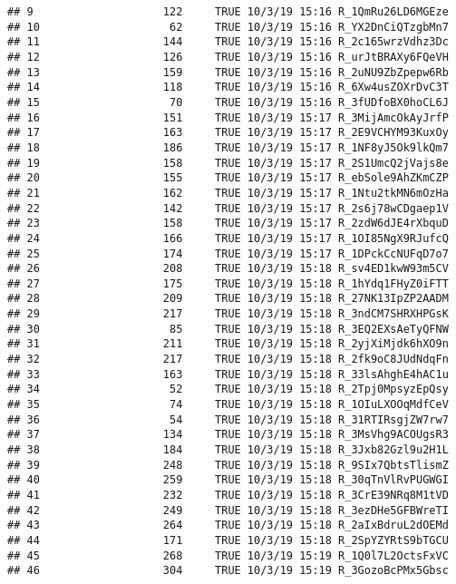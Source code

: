 \documentclass[]{article}
\begin{document}
\begin{verbatim}
## 9                    122     TRUE 10/3/19 15:16 R_1QmRu26LD6MGEze
## 10                    62     TRUE 10/3/19 15:16 R_YX2DnCiQTzgbMn7
## 11                   144     TRUE 10/3/19 15:16 R_2c165wrzVdhz3Dc
## 12                   126     TRUE 10/3/19 15:16 R_urJtBRAXy6FQeVH
## 13                   159     TRUE 10/3/19 15:16 R_2uNU9ZbZpepw6Rb
## 14                   118     TRUE 10/3/19 15:16 R_6Xw4usZOXrDvC3T
## 15                    70     TRUE 10/3/19 15:16 R_3fUDfoBX0hoCL6J
## 16                   151     TRUE 10/3/19 15:17 R_3MijAmcOkAyJrfP
## 17                   163     TRUE 10/3/19 15:17 R_2E9VCHYM93KuxOy
## 18                   186     TRUE 10/3/19 15:17 R_1NF8yJ5Ok9lkQm7
## 19                   158     TRUE 10/3/19 15:17 R_2S1UmcQ2jVajs8e
## 20                   155     TRUE 10/3/19 15:17 R_ebSole9AhZKmCZP
## 21                   162     TRUE 10/3/19 15:17 R_1Ntu2tkMN6mOzHa
## 22                   142     TRUE 10/3/19 15:17 R_2s6j78wCDgaep1V
## 23                   158     TRUE 10/3/19 15:17 R_2zdW6dJE4rXbquD
## 24                   166     TRUE 10/3/19 15:17 R_1OI85NgX9RJufcQ
## 25                   174     TRUE 10/3/19 15:17 R_1DPckCcNUFqD7o7
## 26                   208     TRUE 10/3/19 15:18 R_sv4ED1kwW93m5CV
## 27                   175     TRUE 10/3/19 15:18 R_1hYdq1FHyZ0iFTT
## 28                   209     TRUE 10/3/19 15:18 R_27NK13IpZP2AADM
## 29                   217     TRUE 10/3/19 15:18 R_3ndCM7SHRXHPGsK
## 30                    85     TRUE 10/3/19 15:18 R_3EQ2EXsAeTyQFNW
## 31                   211     TRUE 10/3/19 15:18 R_2yjXiMjdk6hXO9n
## 32                   217     TRUE 10/3/19 15:18 R_2fk9oC8JUdNdqFn
## 33                   163     TRUE 10/3/19 15:18 R_33lsAhghE4hAC1u
## 34                    52     TRUE 10/3/19 15:18 R_2Tpj0MpsyzEpQsy
## 35                    74     TRUE 10/3/19 15:18 R_1OIuLXOOqMdfCeV
## 36                    54     TRUE 10/3/19 15:18 R_31RTIRsgjZW7rw7
## 37                   134     TRUE 10/3/19 15:18 R_3MsVhg9ACOUgsR3
## 38                   184     TRUE 10/3/19 15:18 R_3Jxb82Gzl9u2H1L
## 39                   248     TRUE 10/3/19 15:18 R_9SIx7QbtsTlismZ
## 40                   259     TRUE 10/3/19 15:18 R_30qTnVlRvPUGWGI
## 41                   232     TRUE 10/3/19 15:18 R_3CrE39NRq8M1tVD
## 42                   249     TRUE 10/3/19 15:18 R_3ezDHe5GFBWreTI
## 43                   264     TRUE 10/3/19 15:18 R_2aIxBdruL2dOEMd
## 44                   171     TRUE 10/3/19 15:18 R_2SpYZYRtS9bTGCU
## 45                   268     TRUE 10/3/19 15:19 R_1Q0l7L2OctsFxVC
## 46                   304     TRUE 10/3/19 15:19 R_3GozoBcPMx5Gbsc

\end{verbatim}
\end{document}
